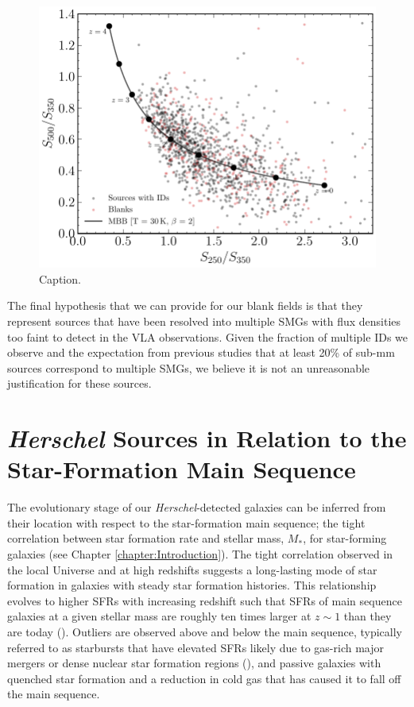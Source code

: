 \begin{figure}
	\centering
	\includegraphics[width=0.75\columnwidth]{Figures/blank_fir_colours.pdf}
	\caption{{\color{red} Caption.}}
	\label{fig:blank_fir_colours}
\end{figure}

The final hypothesis that we can provide for our blank fields is that they represent sources that have been resolved into multiple SMGs with flux densities too faint to detect in the VLA observations. Given the fraction of multiple IDs we observe and the expectation from previous studies that at least 20\% of sub-mm sources correspond to multiple SMGs, we believe it is not an unreasonable justification for these sources.

\section{\textit{Herschel} Sources in Relation to the Star-Formation Main Sequence}

The evolutionary stage of our \textit{Herschel}-detected galaxies can be inferred from their location with respect to the star-formation main sequence; the tight correlation between star formation rate and stellar mass, $M_*$, for star-forming galaxies (see Chapter \ref{chapter:Introduction}). The tight correlation observed in the local Universe and at high redshifts suggests a long-lasting mode of star formation in galaxies with steady star formation histories. This relationship evolves to higher SFRs with increasing redshift such that SFRs of main sequence galaxies at a given stellar mass are roughly ten times larger at $z\sim1$ than they are today (\citealt{Noeske_2007}). Outliers are observed above and below the main sequence, typically referred to as starbursts that have elevated SFRs likely due to gas-rich major mergers or dense nuclear star formation regions (\citealt{Daddi_2010}), and passive galaxies with quenched star formation and a reduction in cold gas that has caused it to fall off the main sequence. 

